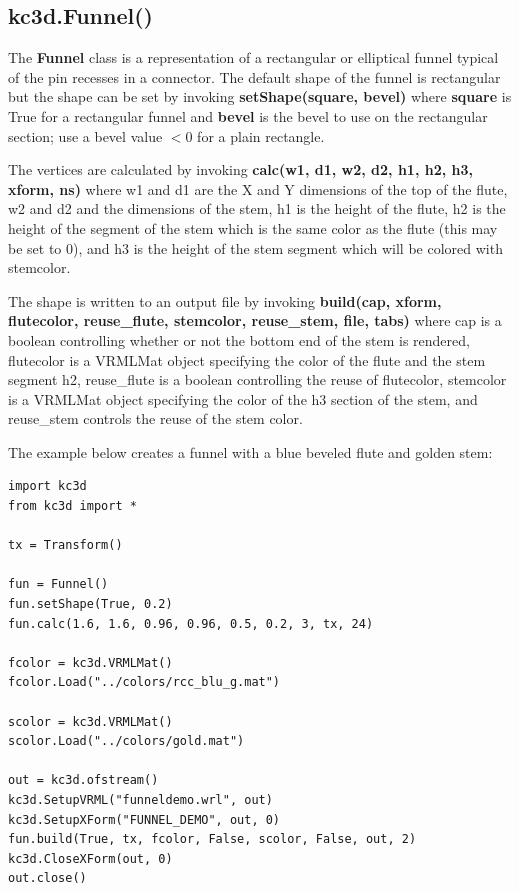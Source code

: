 \subsection{kc3d.Funnel()}
The \textbf{Funnel} class is a representation of a rectangular or elliptical funnel typical
of the pin recesses in a connector. The default shape of the funnel is rectangular but the
shape can be set by invoking \textbf{setShape(square, bevel)} where \textbf{square} is True for
a rectangular funnel and \textbf{bevel} is the bevel to use on the rectangular section; use
a bevel value $<0$ for a plain rectangle.

The vertices are calculated by invoking \textbf{calc(w1, d1, w2, d2, h1, h2, h3, xform, ns)}
where w1 and d1 are the X and Y dimensions of the top of the flute, w2 and d2 and the
dimensions of the stem, h1 is the height of the flute, h2 is the height of the segment of
the stem which is the same color as the flute (this may be set to 0), and h3 is the
height of the stem segment which will be colored with stemcolor.

The shape is written to an output file by invoking \textbf{build(cap, xform, flutecolor,
reuse\_flute, stemcolor, reuse\_stem, file, tabs)} where cap is a boolean controlling
whether or not the bottom end of the stem is rendered, flutecolor is a VRMLMat object
specifying the color of the flute and the stem segment h2, reuse\_flute is a boolean
controlling the reuse of flutecolor, stemcolor is a VRMLMat object specifying the color
of the h3 section of the stem, and reuse\_stem controls the reuse of the stem color.

The example below creates a funnel with a blue beveled flute and golden stem:

\begin{verbatim}
import kc3d
from kc3d import *

tx = Transform()

fun = Funnel()
fun.setShape(True, 0.2)
fun.calc(1.6, 1.6, 0.96, 0.96, 0.5, 0.2, 3, tx, 24)

fcolor = kc3d.VRMLMat()
fcolor.Load("../colors/rcc_blu_g.mat")

scolor = kc3d.VRMLMat()
scolor.Load("../colors/gold.mat")

out = kc3d.ofstream()
kc3d.SetupVRML("funneldemo.wrl", out)
kc3d.SetupXForm("FUNNEL_DEMO", out, 0)
fun.build(True, tx, fcolor, False, scolor, False, out, 2)
kc3d.CloseXForm(out, 0)
out.close()
\end{verbatim}

